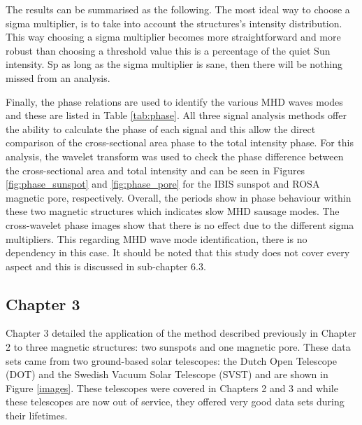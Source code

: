     The results can be summarised as the following.
    The most ideal way to choose a sigma multiplier, is to take into account the structures's intensity distribution.
    This way choosing a sigma multiplier becomes more straightforward and more robust than choosing a threshold value this is a percentage of the quiet Sun intensity.
    Sp as long as the sigma multiplier is sane, then there will be nothing missed from an analysis.
    
    Finally, the phase relations are used to identify the various MHD waves modes and these are listed in Table \ref{tab:phase}.
    All three signal analysis methods offer the ability to calculate the phase of each signal and this allow the direct comparison of the cross-sectional area phase to the total intensity phase.
    For this analysis, the wavelet transform was used to check the phase difference between the cross-sectional area and total intensity and can be seen in Figures \ref{fig:phase_sunspot} and \ref{fig:phase_pore} for the IBIS sunspot and ROSA magnetic pore, respectively.
    Overall, the periods show in phase behaviour within these two magnetic structures which indicates slow MHD sausage modes. 
    The cross-wavelet phase images show that there is no effect due to the different sigma multipliers. 
    This regarding MHD wave mode identification, there is no dependency in this case.
    It should be noted that this study does not cover every aspect and this is discussed in sub-chapter 6.3.

   	\subsection{Chapter 3}
    	
    Chapter 3 detailed the application of the method described previously in Chapter 2 to three magnetic structures: two sunspots and one magnetic pore.
    These data sets came from two ground-based solar telescopes: the Dutch Open Telescope (DOT) and the Swedish Vacuum Solar Telescope (SVST) and are shown in Figure \ref{images}.
    These telescopes were covered in Chapters 2 and 3 and while these telescopes are now out of service, they offered very good data sets during their lifetimes.
    
